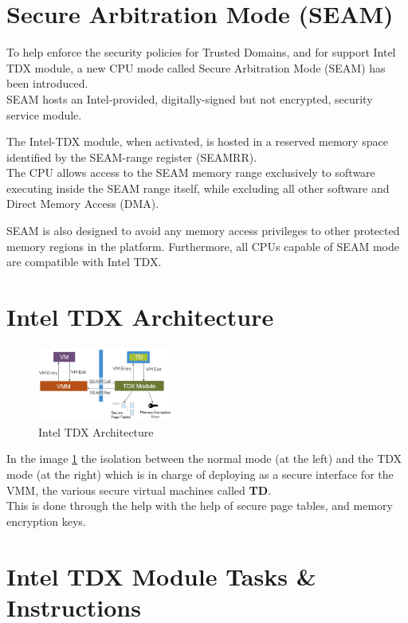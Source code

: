 \section{Secure Arbitration Mode (SEAM)}

To help enforce the security policies for Trusted Domains, and for support Intel TDX module, a new CPU mode called Secure Arbitration Mode (SEAM) has been introduced.\\ SEAM hosts an Intel-provided, digitally-signed but not encrypted, security service module. \bigskip

The Intel-TDX module, when activated, is hosted in a reserved memory space identified by the SEAM-range register (SEAMRR). \\ The CPU allows access to the SEAM memory range exclusively to software executing inside the SEAM range itself, while excluding all other software and Direct Memory Access (DMA). \bigskip

SEAM is also designed to avoid any memory access privileges to other protected memory regions in the platform. Furthermore, all CPUs capable of SEAM mode are compatible with Intel TDX.

\section{Intel TDX Architecture}

\begin{figure}[H]
    \centering
    \includegraphics[width=0.4\textwidth]{img/intel tdx arch.png}
    \caption{Intel TDX Architecture}
    \label{fig:tdx arch}
\end{figure}

In the image \ref{fig:tdx arch} the isolation between the normal mode (at the left) and the TDX mode (at the right) which is in charge of deploying as a secure interface for the VMM, the various secure virtual machines called \textbf{TD}. \\
This is done through the help with the help of secure page tables, and memory encryption keys.

\section{Intel TDX Module Tasks \& Instructions}

